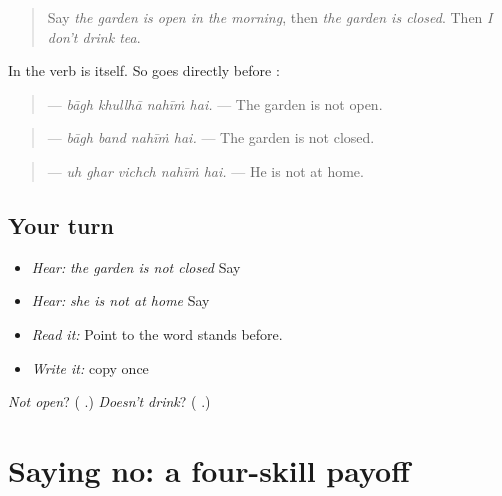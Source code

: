 \begin{quote}
Say \emph{the garden is open in the morning}, then \emph{the garden is closed}. Then \emph{I don't drink tea}.
\end{quote}

\begin{grammarlens}[title={Grammar Lens: when \pa{ਹੈ} is the verb}]
In \textbf{  } the verb is \textbf{} itself. So \textbf{} goes directly before \textbf{}:

\begin{quote}
\textbf{   } — \emph{bāgh khullhā nahīṁ hai.} — The garden is not open.
\end{quote}

\begin{quote}
\textbf{   } — \emph{bāgh band nahīṁ hai.} — The garden is not closed.
\end{quote}

\begin{quote}
\textbf{    } — \emph{uh ghar vichch nahīṁ hai.} — He is not at home.
\end{quote}
\end{grammarlens}

\subsection*{Your turn}
\begin{itemize}
\raggedright
  \item \emph{Hear:} \emph{the garden is not closed} Say \textbf{   }
  \item \emph{Hear:} \emph{she is not at home} Say \textbf{    }
  \item \emph{Read it:} \textbf{   } Point to the word \textbf{} stands before.
  \item \emph{Write it:} copy \textbf{ } once
\end{itemize}

\begin{tcolorbox}[breakable,colback=teal!4,colframe=teal!35!black,title={Before you move on}]
\emph{Not open}? (\textbf{  }.) \emph{Doesn't drink}? (\textbf{  }.)
\end{tcolorbox}
\section[\texorpdfstring{\pa{ਮੈਂ} \pa{ਚਾਹ} \pa{ਨਹੀਂ} \pa{ਪੀਂਦਾ} \pa{ਹਾਂ।} (maiṁ chāh nahīṁ …)}{ਮੈਂ ਚਾਹ ਨਹੀਂ ਪੀਂਦਾ ਹਾਂ। (maiṁ chāh nahīṁ …)}]{Saying no: a four-skill payoff}

